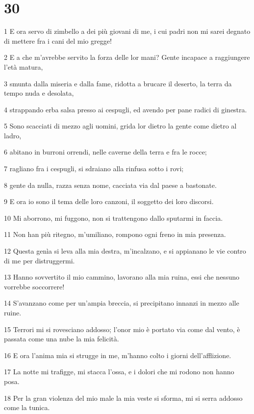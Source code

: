 \chapter{30}

\par 1 E ora servo di zimbello a dei più giovani di me, i cui padri non mi sarei degnato di mettere fra i cani del mio gregge!
\par 2 E a che m'avrebbe servito la forza delle lor mani? Gente incapace a raggiungere l'età matura,
\par 3 smunta dalla miseria e dalla fame, ridotta a brucare il deserto, la terra da tempo nuda e desolata,
\par 4 strappando erba salsa presso ai cespugli, ed avendo per pane radici di ginestra.
\par 5 Sono scacciati di mezzo agli uomini, grida lor dietro la gente come dietro al ladro,
\par 6 abitano in burroni orrendi, nelle caverne della terra e fra le rocce;
\par 7 ragliano fra i cespugli, si sdraiano alla rinfusa sotto i rovi;
\par 8 gente da nulla, razza senza nome, cacciata via dal paese a bastonate.
\par 9 E ora io sono il tema delle loro canzoni, il soggetto dei loro discorsi.
\par 10 Mi aborrono, mi fuggono, non si trattengono dallo sputarmi in faccia.
\par 11 Non han più ritegno, m'umiliano, rompono ogni freno in mia presenza.
\par 12 Questa genìa si leva alla mia destra, m'incalzano, e si appianano le vie contro di me per distruggermi.
\par 13 Hanno sovvertito il mio cammino, lavorano alla mia ruina, essi che nessuno vorrebbe soccorrere!
\par 14 S'avanzano come per un'ampia breccia, si precipitano innanzi in mezzo alle ruine.
\par 15 Terrori mi si rovesciano addosso; l'onor mio è portato via come dal vento, è passata come una nube la mia felicità.
\par 16 E ora l'anima mia si strugge in me, m'hanno colto i giorni dell'afflizione.
\par 17 La notte mi trafigge, mi stacca l'ossa, e i dolori che mi rodono non hanno posa.
\par 18 Per la gran violenza del mio male la mia veste si sforma, mi si serra addosso come la tunica.
